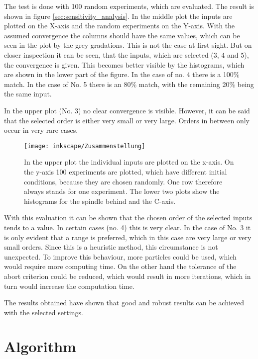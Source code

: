 The test is done with 100 random experiments, which are evaluated. The result is shown in figure \ref{sec:sensitivity_analysis}. In the middle plot the inputs are plotted on the X-axis and the random experiments on the Y-axis. With the assumed convergence the columns should have the same values, which can be seen in the plot by the grey gradations. This is not the case at first sight. But on closer inspection it can be seen, that the inputs, which are selected (3, 4 and 5), the convergence is given.  This becomes better visible by the histograms, which are shown in the lower part of the figure. In the case of no. 4 there is a 100\% match. In the case of No. 5 there is an 80\% match, with the remaining 20\% being the same input. 

In the upper plot (No. 3) no clear convergence is visible. However, it can be said that the selected order is either very small or very large. Orders in between only occur in very rare cases. 

\begin{figure}[!htb]
    \centering
    \texttt{[image: inkscape/Zusammenstellung]} %
    \caption[Sensitivity Analysis]{In the upper plot the individual inputs are plotted on the x-axis. On the y-axis 100 experiments are plotted, which have different initial conditions, because they are chosen randomly. One row therefore always stands for one experiment. The lower two plots show the histograms for the spindle behind and the C-axis.}
    \label{fig:flowchart}
\end{figure}

With this evaluation it can be shown that the chosen order of the selected inputs tends to a value. In certain cases (no. 4) this is very clear. In the case of No. 3 it is only evident that a range is preferred, which in this case are very large or very small orders. Since this is a heuristic method, this circumstance is not unexpected. To improve this behaviour, more particles could be used, which would require more computing time. On the other hand the tolerance of the abort criterion could be reduced, which would result in more iterations, which in turn would increase the computation time.

The results obtained have shown that good and robust results can be achieved with the selected settings. 



\section{Algorithm}
\label{sec:algorithm}

